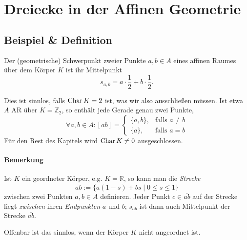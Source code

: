 \section{Dreiecke in der Affinen Geometrie}
 \subsection{Beispiel \& Definition}
 	\begin{Definition}[Mittelpunkt]
 		Der (geometrische) Schwerpunkt zweier Punkte $ a,b\in A $ eines affinen Raumes über dem Körper $ K $ ist ihr Mittelpunkt
 		\[
 			s_{a,b} = a\cdot \frac{1}{2}+b\cdot \frac{1}{2}.
 		\]
 	\end{Definition}

 	Dies ist sinnlos, falls $ \operatorname{Char} K = 2 $ ist, was wir also ausschließen müssen.
 	Ist etwa $ A $ AR über $ K=\mathbb{Z}_2 $, so enthält jede Gerade genau zwei Punkte,
 	\[
 		\forall a,b\in A: [ab] =
 		\begin{cases}
 			\{a,b\}, & \text{falls }a\neq b \\
 			\{a\},   & \text{falls } a=b
 		\end{cases}
 	\]
 	Für den Rest des Kapitels wird $ \operatorname{Char} K \neq 0 $ ausgeschlossen.
 	\paragraph{Bemerkung}
 		Ist $ K $ ein geordneter Körper, e.g. $ K=\mathbb{R} $, so kann man die \emph{Strecke}
 		\[
 			\overline{ab}:= \{a(1-s)+bs\mid 0\leq s\leq 1\}
 		\]
 		zwischen zwei Punkten $ a,b\in A $ definieren. Jeder Punkt $ c\in \overline{ab} $ auf der Strecke liegt \emph{zwischen} ihren \emph{Endpunkten} $ a $ und $ b $; $ s_{ab} $ ist dann auch Mittelpunkt der Strecke $ \overline{ab} $.

 		Offenbar ist das sinnlos, wenn der Körper $ K $ nicht angeordnet ist.


